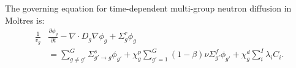 The governing equation for time-dependent multi-group neutron diffusion in
Moltres is:
%
\begin{align}
	\frac{1}{v_g} &\frac{\partial \phi_g}{\partial t} - \nabla \cdot D_g
	\nabla \phi_g + \Sigma^r_g \phi_g \nonumber \\ 
	&= \sum^G_{g \neq g'} \Sigma^s_{g' \rightarrow g} \phi_{g'} + \chi^p_g
	\sum^G_{g'=1} (1-\beta) \nu \Sigma^f_{g'} \phi_{g'} + \chi^d_g \sum^I_i
	\lambda_i C_i. \label{eq:neut}
\end{align}

